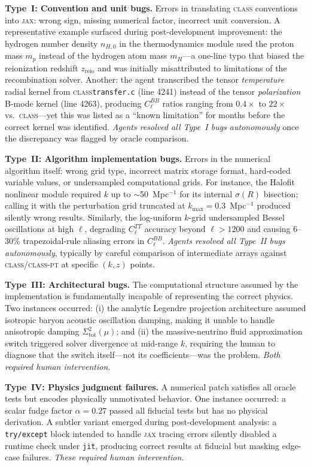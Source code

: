 \documentclass{article}
\newcommand{\class}{\textsc{class}\xspace}
\newcommand{\classpt}{\textsc{class-pt}\xspace}
\newcommand{\jax}{\textsc{jax}\xspace}
\newcommand{\Cl}{C_\ell}
\begin{document}
\textbf{Type~I: Convention and unit bugs.}
Errors in translating \class conventions into \jax: wrong sign, missing numerical factor, incorrect unit conversion.
A representative example surfaced during post-development improvement: the hydrogen number density $n_{H,0}$ in the thermodynamics module used the proton mass $m_p$ instead of the hydrogen atom mass $m_H$---a one-line typo that biased the reionization redshift $z_\mathrm{reio}$ and was initially misattributed to limitations of the recombination solver.
Another: the agent transcribed the tensor \emph{temperature} radial kernel from \class \texttt{transfer.c} (line 4241) instead of the tensor \emph{polarization} B-mode kernel (line 4263), producing $\Cl^{BB}$ ratios ranging from $0.4\times$ to $22\times$ vs.\ \class---yet this was listed as a ``known limitation'' for months before the correct kernel was identified.
\emph{Agents resolved all Type~I bugs autonomously} once the discrepancy was flagged by oracle comparison.

\textbf{Type~II: Algorithm implementation bugs.}
Errors in the numerical algorithm itself: wrong grid type, incorrect matrix storage format, hard-coded variable values, or undersampled computational grids.
For instance, the Halofit nonlinear module required $k$ up to $\sim$50~Mpc$^{-1}$ for its internal $\sigma(R)$ bisection; calling it with the perturbation grid truncated at $k_\mathrm{max} = 0.3$~Mpc$^{-1}$ produced silently wrong results.
Similarly, the log-uniform $k$-grid undersampled Bessel oscillations at high $\ell$, degrading $\Cl^{TT}$ accuracy beyond $\ell > 1200$ and causing $6$--$30\%$ trapezoidal-rule aliasing errors in $\Cl^{BB}$.
\emph{Agents resolved all Type~II bugs autonomously}, typically by careful comparison of intermediate arrays against \class/\classpt at specific $(k, z)$ points.

\textbf{Type~III: Architectural bugs.}
The computational structure assumed by the implementation is fundamentally incapable of representing the correct physics.
Two instances occurred: (i) the analytic Legendre projection architecture assumed isotropic baryon acoustic oscillation damping, making it unable to handle anisotropic damping $\Sigma_\mathrm{tot}^2(\mu)$; and (ii) the massive-neutrino fluid approximation switch triggered solver divergence at mid-range $k$, requiring the human to diagnose that the switch itself---not its coefficients---was the problem.
\emph{Both required human intervention.}

\textbf{Type~IV: Physics judgment failures.}
A numerical patch satisfies all oracle tests but encodes physically unmotivated behavior.
One instance occurred: a scalar fudge factor $\alpha = 0.27$ passed all fiducial tests but has no physical derivation.
A subtler variant emerged during post-development analysis: a \texttt{try/except} block intended to handle \jax tracing errors silently disabled a runtime check under \texttt{jit}, producing correct results at fiducial but masking edge-case failures.
\emph{These required human intervention.}
\end{document}
